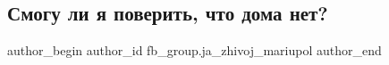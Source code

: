  
 
 
 
 

\subsection{Смогу ли я поверить, что дома нет?}
\label{sec:25_02_2023.fb.fb_group.ja_zhivoj_mariupol.1.smogu_li_ya_poverit_}

\ifcmt
 author_begin
   author_id fb_group.ja_zhivoj_mariupol
 author_end
\fi
